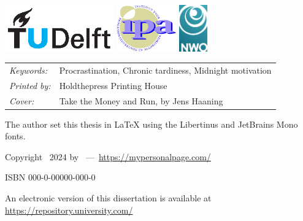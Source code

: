 \begin{titlepage}
\medskip
\vfill
\begin{center}
  \includegraphics[trim={0.2cm 0.8cm 0.3cm 0.3cm},clip,height=2.0cm]{000-title/TUDelft_logo_cmyk}
  \hspace{2em}
  \includegraphics[height=2.0cm]{000-title/ipa}
  \hspace{2em}
  \includegraphics[height=2.0cm]{000-title/NWO logo - full colour - CMYK}
\end{center}
\vfill

\noindent
\begin{tabular}{@{}p{}@{}p{}}
  \textit{Keywords:} & Procrastination, Chronic tardiness, Midnight motivation \\[\medskipamount]
  \textit{Printed by:} & Holdthepress Printing House \\[\medskipamount]
  \textit{Cover:} & Take the Money and Run, by Jens Haaning \\[\medskipamount]
\end{tabular}

\medskip
\medskip

\noindent The author set this thesis in \LaTeX\xspace using the Libertinus and JetBrains Mono fonts.

\vspace{\bigskipamount}

\noindent Copyright \textcopyright\ 2024 by \makeatletter{\@firstname\ \@lastname}\makeatother\ ---\ \url{https://mypersonalpage.com/}

\medskip

\noindent ISBN 000-0-00000-000-0

\medskip
\noindent An electronic version of this dissertation is available at \\
\url{https://repository.university.com/}

\end{titlepage}